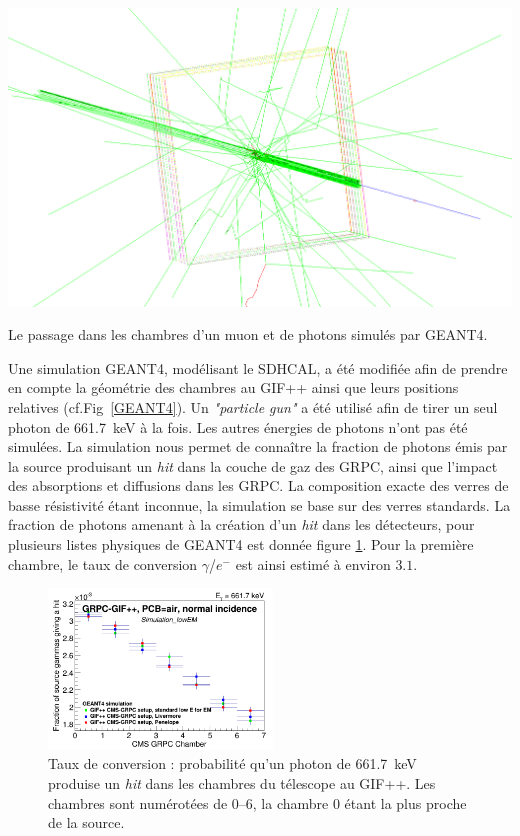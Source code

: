 \marginpar
{
	\centering
	\includegraphics[width=\marginparwidth]{GLA/geant4.png}
	\captionsetup{type=figure}\caption{Le passage dans les chambres d'un muon et de photons simulés par GEANT4.}
	\label{GEANT4}
}

Une simulation GEANT4, modélisant le SDHCAL, a été modifiée afin de prendre en compte la géométrie des chambres au GIF++ ainsi que leurs positions relatives (cf.Fig~\ref{GEANT4}). Un \textit{"particle gun"} a été utilisé afin de tirer un seul photon de \SI{661.7}{\kilo\eV} à la fois. Les autres énergies de photons n'ont pas été simulées. La simulation nous permet de connaître la fraction de photons émis par la source produisant un \textit{hit} dans la couche de gaz des GRPC, ainsi que l'impact des absorptions et diffusions dans les GRPC. La composition exacte des verres de basse résistivité étant inconnue, la simulation se base sur des verres standards. La fraction de photons amenant à la création d'un \textit{hit} dans les détecteurs, pour plusieurs listes physiques de GEANT4 est donnée figure \ref{conversion}. Pour la première chambre, le taux de conversion $\gamma$/$e^{-}$ est ainsi estimé à environ $\num{3.1}$\textperthousand.

\begin{figure}[!ht]
	\centering
	\includegraphics[width=0.53\textwidth]{GLA/taux.png}
	\caption{Taux de conversion : probabilité qu'un photon de \SI{661.7}{\kilo\eV} produise un \textit{hit} dans les chambres du télescope au GIF++. Les chambres sont numérotées de \SIrange{0}{6}{}, la chambre \num{0} étant la plus proche de la source.}
	\label{conversion}
\end{figure}

